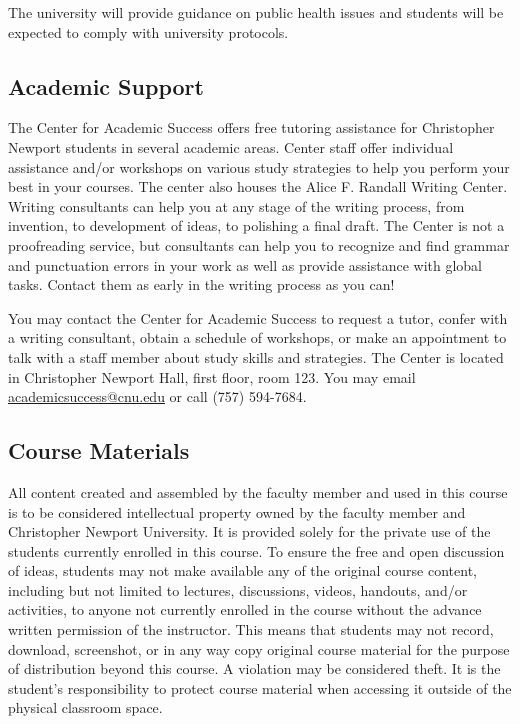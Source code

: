 \documentclass[11pt]{article}
\begin{document}
The university will provide guidance on public health issues and students will be expected to comply with university protocols.

\subsection{Academic Support}

The Center for Academic Success offers free tutoring assistance for Christopher Newport students in several academic areas. Center staff offer individual assistance and/or workshops on various study strategies to help you perform your best in your courses. The center also houses the Alice F. Randall Writing Center. Writing consultants can help you at any stage of the writing process, from invention, to development of ideas, to polishing a final draft. The Center is not a proofreading service, but consultants can help you to recognize and find grammar and punctuation errors in your work as well as provide assistance with global tasks. Contact them as early in the writing process as you can!

You may contact the Center for Academic Success to request a tutor, confer with a writing consultant, obtain a schedule of workshops, or make an appointment to talk with a staff member about study skills and strategies. The Center is located in Christopher Newport Hall, first floor, room 123. You may email \href{mailto:academicsuccess@cnu.edu}{academicsuccess@cnu.edu} or call (757) 594-7684.

\subsection{Course Materials}

All content created and assembled by the faculty member and used in this course is to be considered intellectual property owned by the faculty member and Christopher Newport University. It is provided solely for the private use of the students currently enrolled in this course. To ensure the free and open discussion of ideas, students may not make available any of the original course content, including but not limited to lectures, discussions, videos, handouts, and/or activities, to anyone not currently enrolled in the course without the advance written permission of the instructor. This means that students may not record, download, screenshot, or in any way copy original course material for the purpose of distribution beyond this course. A violation may be considered theft. It is the student's responsibility to protect course material when accessing it outside of the physical classroom space.
\end{document}
